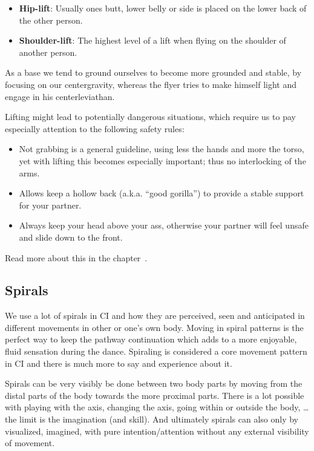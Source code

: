 \begin{itemize}
    \item \textbf{Hip-lift}: Usually ones butt, lower belly or side is placed on the lower back of the other person.
    \item \textbf{Shoulder-lift}: The highest level of a lift when flying on the shoulder of another person.
\end{itemize}

As a base we tend to ground ourselves to become more grounded and stable, by focusing on our \gls{centergravity},
whereas the flyer tries to make himself light and engage in his \gls{centerleviathan}.

Lifting might lead to potentially dangerous situations, which require us to pay especially attention to the following safety rules:

\begin{itemize}
    \item Not grabbing is a general guideline, using less the hands and more the torso, yet with lifting this becomes especially important; thus no interlocking of the arms.
    \item Allows keep a hollow back (a.k.a. ``good gorilla'') to provide a stable support for your partner.
    \item Always keep your head above your ass, otherwise your partner will feel unsafe and slide down to the front.
\end{itemize}

Read more about this in the chapter~.

\subsection{Spirals}\label{subsec:spirals}

We use a lot of spirals in CI and how they are perceived, seen and anticipated in different movements in other or one's own body.
Moving in spiral patterns is the perfect way to keep the pathway continuation which adds to a more enjoyable, fluid sensation during the dance.
Spiraling is considered a core movement pattern in CI and there is much more to say and experience about it.

Spirals can be very visibly be done between two body parts by moving from the distal parts of the body towards the more proximal parts.
There is a lot possible with playing with the axis, changing the axis, going within or outside the body, \ldots the limit is the imagination (and skill).
And ultimately spirals can also only by visualized, imagined, with pure intention/attention without any external visibility of movement.

